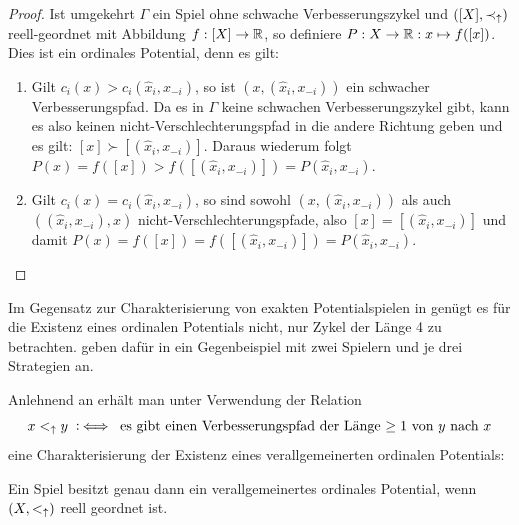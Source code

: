 \begin{proof}
	Ist umgekehrt $\Gamma$ ein Spiel ohne schwache Verbesserungszykel und $([X], \prec_\uparrow)$ reell-geordnet mit Abbildung $f: [X] \to \mathbb{R}$, so definiere $P: X \to \mathbb{R}: x \mapsto f([x])$. Dies ist ein ordinales Potential, denn es gilt:
	\begin{enumerate}
		\item Gilt $c_i(x) > c_i(\hat{x}_i, x_{-i})$, so ist $(x, (\hat{x}_i, x_{-i}))$ ein schwacher Verbesserungspfad. Da es in $\Gamma$ keine schwachen Verbesserungszykel gibt, kann es also keinen nicht-Verschlechterungspfad in die andere Richtung geben und es gilt: $[x] \succ [(\hat{x}_i, x_{-i})]$. Daraus wiederum folgt $P(x) = f([x]) > f([(\hat{x}_i, x_{-i})]) = P(\hat{x}_i, x_{-i})$.
		\item Gilt $c_i(x) = c_i(\hat{x}_i, x_{-i})$, so sind sowohl $(x, (\hat{x}_i, x_{-i}))$ als auch $((\hat{x}_i, x_{-i}), x)$ nicht-Verschlechterungspfade, also $[x] = [(\hat{x}_i, x_{-i})]$ und damit $P(x) = f([x]) = f([(\hat{x}_i, x_{-i})]) = P(\hat{x}_i, x_{-i})$. \qedhere
	\end{enumerate}
\end{proof}

\begin{bem}
	Im Gegensatz zur Charakterisierung von exakten Potentialspielen in  genügt es für die Existenz eines ordinalen Potentials nicht, nur Zykel der Länge 4 zu betrachten. \citeauthor{CharExOrdPot} geben dafür in \cite[Beispiel 3.1]{CharExOrdPot} ein Gegenbeispiel mit zwei Spielern und je drei Strategien an.
\end{bem}

Anlehnend an  erhält man unter Verwendung der Relation
	\[x <_\uparrow y \mathbin{~\mathop:\!\!\iff} \text{ es gibt einen Verbesserungspfad der Länge $\geq 1$ von $y$ nach $x$}\]
eine Charakterisierung der Existenz eines verallgemeinerten ordinalen Potentials:
\begin{satz}\label{satz:CharVerallOrdPot}
	Ein Spiel besitzt genau dann ein verallgemeinertes ordinales Potential, wenn $(X, <_\uparrow)$ reell geordnet ist.
\end{satz}

